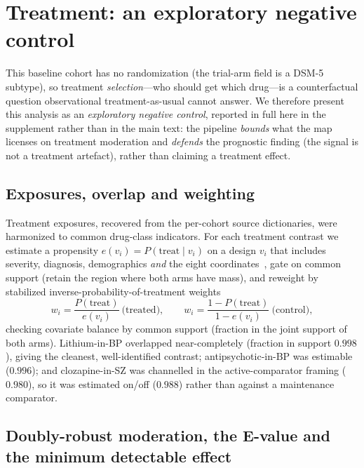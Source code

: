 \section{Treatment: an exploratory negative control}
\label{ann:treatment}

This baseline cohort has no randomization (the trial-arm field is a DSM-5 subtype), so
treatment \emph{selection}---who should get which drug---is a counterfactual question
observational treatment-as-usual cannot answer. We therefore present this analysis as an
\emph{exploratory negative control}, reported in full here in the supplement rather than in
the main text: the pipeline \emph{bounds} what the map licenses on treatment moderation and
\emph{defends} the prognostic finding (the signal is not a treatment artefact), rather than
claiming a treatment effect.

\subsection{Exposures, overlap and weighting}

Treatment exposures, recovered from the per-cohort source dictionaries, were harmonized
to common drug-class indicators. For each treatment contrast we estimate a propensity
$e(v_i)=P(\text{treat}\mid v_i)$ on a design $v_i$ that includes severity, diagnosis,
demographics \emph{and} the eight coordinates~\citep{rosenbaum1983propensity}, gate on
common support (retain the region where both arms have mass), and reweight by stabilized
inverse-probability-of-treatment weights~\citep{austin2011iptw}
\begin{equation}
  w_i=\frac{P(\text{treat})}{e(v_i)}\ \text{(treated)},\qquad
  w_i=\frac{1-P(\text{treat})}{1-e(v_i)}\ \text{(control)} ,
\end{equation}
checking covariate balance by common support (fraction in the joint support of both
arms). Lithium-in-BP overlapped near-completely (fraction in support $0.998$), giving the
cleanest, well-identified contrast; antipsychotic-in-BP was estimable ($0.996$); and
clozapine-in-SZ was channelled in the active-comparator framing ($0.980$), so it was
estimated on/off ($0.988$) rather than against a maintenance comparator.

\subsection{Doubly-robust moderation, the E-value and the minimum detectable effect}

